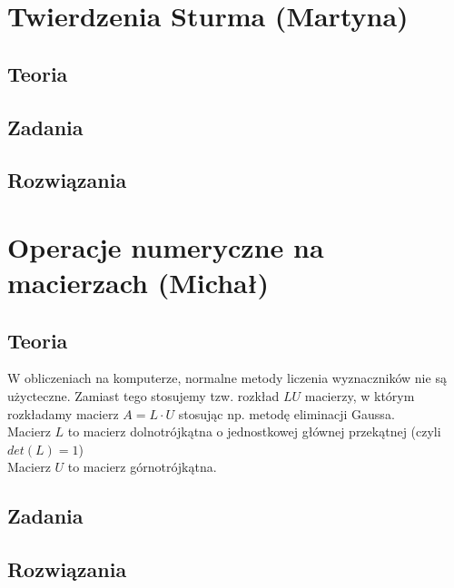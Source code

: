\documentclass[a4paper]{article}
\begin{document}
\section{Twierdzenia Sturma (Martyna)}
\subsection{Teoria}

\subsection{Zadania}

\subsection{Rozwiązania}

\section{Operacje numeryczne na macierzach (Michał)}
\subsection{Teoria}
W obliczeniach na komputerze, normalne metody liczenia wyznaczników nie są użycteczne. Zamiast tego stosujemy tzw. rozkład $LU$ macierzy, w którym rozkładamy macierz $A = L\cdot U$ stosując np. metodę eliminacji Gaussa.\\
Macierz $L$ to macierz dolnotrójkątna o jednostkowej głównej przekątnej (czyli $det(L)=1$)\\
Macierz $U$ to macierz górnotrójkątna.\\


\subsection{Zadania}

\subsection{Rozwiązania}

\newpage
\tableofcontents
\end{document}
